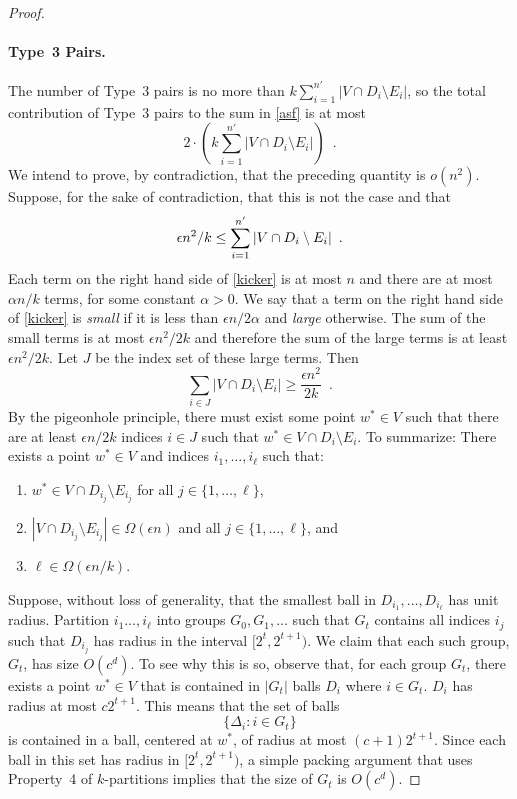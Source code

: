 \documentclass{patmorin}
\begin{document}
\begin{proof}
  \paragraph{Type~3 Pairs.}
  The number of Type~3 pairs is no more than $k\sum_{i=1}^{n'}|V\cap
  D_i\setminus E_i|$, so the total contribution of Type~3 pairs to 
  the sum in \eqref{asf} is at most
  \[
      2\cdot\left(k\sum_{i=1}^{n'} |V\cap D_i\setminus E_i|\right) \enspace .
  \]
  We intend to prove, by contradiction, that the preceding quantity
  is $o(n^2)$.  Suppose, for the sake of contradiction, that this is
  not the case and that
  \begin{equation}
    \epsilon n^2/k \le \sum_{i=1}^{n'} |V\cap D_i\setminus E_i| 
         \enspace . \eqlabel{kicker}
  \end{equation}
  Each term on the right hand side of \eqref{kicker} is at most $n$
  and there are at most $\alpha n/k$ terms, for some constant $\alpha
  >0$.  We say that a term on the right hand side of \eqref{kicker} is
  \emph{small} if it is less than $\epsilon n/2\alpha$ and \emph{large}
  otherwise.  The sum of the small terms is at most $\epsilon n^2/2k$
  and therefore the sum of the large terms is at least $\epsilon n^2/2k$.
  Let $J$ be the index set of these large terms.  Then
  \[
    \sum_{i\in J} |V\cap D_i\setminus E_i| \ge \frac{\epsilon n^2}{2k} \enspace .
  \]
  By the pigeonhole principle, there must exist some point $w^*\in V$
  such that there are at least $\epsilon n/2k$ indices $i\in J$ such
  that $w^*\in V\cap D_i\setminus E_i$.  To summarize: There exists a
  point $w^*\in V$ and indices $i_1,\ldots,i_\ell$ such that:
  \begin{enumerate}
     \item $w^*\in V\cap D_{i_j}\setminus E_{i_j}$ for all
        $j\in\{1,\ldots,\ell\}$,
     \item $|V\cap D_{i_j}\setminus E_{i_j}|\in \Omega(\epsilon n)$
       and all $j\in\{1,\ldots,\ell\}$, and
     \item $\ell\in\Omega(\epsilon n/k)$.
  \end{enumerate}

  Suppose, without loss of generality, that the smallest ball
  in $D_{i_1},\ldots,D_{i_\ell}$ has unit radius.  Partition
  $i_1\ldots,i_\ell$ into groups $G_0,G_1,\ldots$ such that $G_t$
  contains all indices $i_j$ such that $D_{i_j}$ has radius in the
  interval $[2^t,2^{t+1})$.  We claim that each such group, $G_t$, has
  size $O(c^d)$.  To see why this is so, observe that, for each group
  $G_t$, there exists a point $w^*\in V$ that is contained in $|G_t|$
  balls $D_{i}$ where $i\in G_t$.  $D_{i}$ has radius at most $c2^{t+1}$.
  This means that the set of balls
  \[
     \{ \Delta_i : i\in G_t\}
  \]
  is contained in a ball, centered at $w^*$, of radius at most
  $(c+1)2^{t+1}$.  Since each ball in this set has radius in
  $[2^t,2^{t+1})$, a simple packing argument that uses Property~4 of
  $k$-partitions implies that the size of $G_t$ is $O(c^d)$.


\end{proof}
\end{document}
